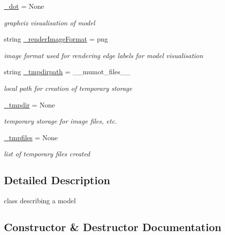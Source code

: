\begin{DoxyCompactItemize}
\hyperlink{class_mu_mo_t_1_1_mu_mo_t_1_1_mu_mo_tmodel_aaabcff4440dc0ded9f9f880c9f86c6c1}{\+\_\+dot} = None
\begin{DoxyCompactList}\small\item\em graphviz visualisation of model \end{DoxyCompactList}\item 
string \hyperlink{class_mu_mo_t_1_1_mu_mo_t_1_1_mu_mo_tmodel_a385c519c2aed996e4bad454f870fed0c}{\+\_\+render\+Image\+Format} = \textquotesingle{}png\textquotesingle{}
\begin{DoxyCompactList}\small\item\em image format used for rendering edge labels for model visualisation \end{DoxyCompactList}\item 
string \hyperlink{class_mu_mo_t_1_1_mu_mo_t_1_1_mu_mo_tmodel_a4ac4f3325e967c92d03e2c4e023a0d5d}{\+\_\+tmpdirpath} = \textquotesingle{}\+\_\+\+\_\+mumot\+\_\+files\+\_\+\+\_\+\textquotesingle{}
\begin{DoxyCompactList}\small\item\em local path for creation of temporary storage \end{DoxyCompactList}\item 
\hyperlink{class_mu_mo_t_1_1_mu_mo_t_1_1_mu_mo_tmodel_ad2feb50403a36ab7c591c04e0cf33cc4}{\+\_\+tmpdir} = None
\begin{DoxyCompactList}\small\item\em temporary storage for image files, etc. \end{DoxyCompactList}\item 
\hyperlink{class_mu_mo_t_1_1_mu_mo_t_1_1_mu_mo_tmodel_a3f2d20ce626e9e6cdc4a4662727121e6}{\+\_\+tmpfiles} = None
\begin{DoxyCompactList}\small\item\em list of temporary files created \end{DoxyCompactList}\end{DoxyCompactItemize}


\subsection{Detailed Description}
class describing a model 

\subsection{Constructor \& Destructor Documentation}
\mbox{\label{class_mu_mo_t_1_1_mu_mo_t_1_1_mu_mo_tmodel_ae64f0875afe3067b97ba370b354b9213}} 
